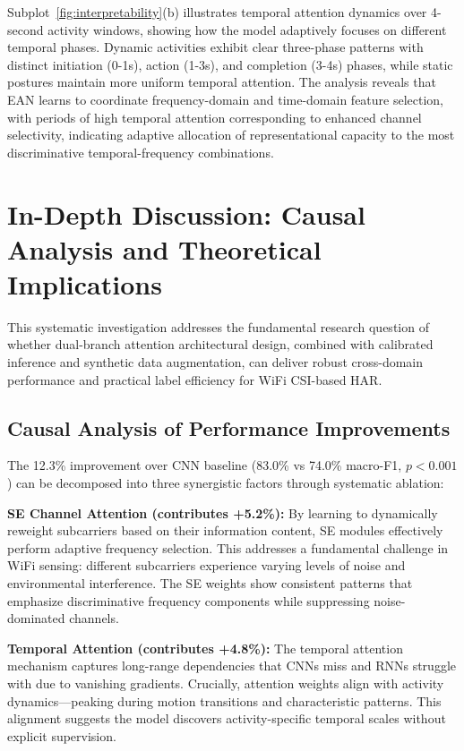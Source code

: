 \documentclass[lettersize,journal]{IEEEtran}
\begin{document}
Subplot~\ref{fig:interpretability}(b) illustrates temporal attention dynamics over 4-second activity windows, showing how the model adaptively focuses on different temporal phases. Dynamic activities exhibit clear three-phase patterns with distinct initiation (0-1s), action (1-3s), and completion (3-4s) phases, while static postures maintain more uniform temporal attention. The analysis reveals that EAN learns to coordinate frequency-domain and time-domain feature selection, with periods of high temporal attention corresponding to enhanced channel selectivity, indicating adaptive allocation of representational capacity to the most discriminative temporal-frequency combinations.

\section{In-Depth Discussion: Causal Analysis and Theoretical Implications}

This systematic investigation addresses the fundamental research question of whether dual-branch attention architectural design, combined with calibrated inference and synthetic data augmentation, can deliver robust cross-domain performance and practical label efficiency for WiFi CSI-based HAR.

\subsection{Causal Analysis of Performance Improvements}

The 12.3\% improvement over CNN baseline (83.0\% vs 74.0\% macro-F1, $p<0.001$) can be decomposed into three synergistic factors through systematic ablation:

\textbf{SE Channel Attention (contributes +5.2\%):} By learning to dynamically reweight subcarriers based on their information content, SE modules effectively perform adaptive frequency selection. This addresses a fundamental challenge in WiFi sensing: different subcarriers experience varying levels of noise and environmental interference. The SE weights show consistent patterns that emphasize discriminative frequency components while suppressing noise-dominated channels.

\textbf{Temporal Attention (contributes +4.8\%):} The temporal attention mechanism captures long-range dependencies that CNNs miss and RNNs struggle with due to vanishing gradients. Crucially, attention weights align with activity dynamics—peaking during motion transitions and characteristic patterns. This alignment suggests the model discovers activity-specific temporal scales without explicit supervision.
\end{document}

